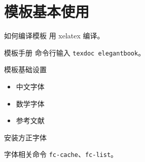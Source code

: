 \section{模板基本使用}
\begin{frame}{如何编译模板}
  用 xelatex 编译。
\end{frame}

\begin{frame}[fragile]{模板手册}
  命令行输入 \lstinline{texdoc elegantbook}。
\end{frame}

\begin{frame}{模板基础设置}
  \begin{itemize}
    \item 中文字体
    \item 数学字体
    \item 参考文献
  \end{itemize}
\end{frame}

\begin{frame}{安装方正字体}
  
\end{frame}

\begin{frame}[fragile]{字体相关命令}
  \lstinline{fc-cache}、\lstinline{fc-list}。
\end{frame}